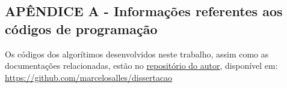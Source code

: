 \documentclass[brazil,hardcopy,openany]{ufscthesis} %
\begin{document}
%




\backmatter

\begin{appendices}
	\chapter{APÊNDICE A - Informações referentes aos códigos de programação} \label{chap:codigos}
	Os códigos dos algorítimos desenvolvidos neste trabalho, assim como as documentações relacionadas, estão no \href{https://github.com/marcelosalles/}{repositório do autor}, disponível em: \url{https://github.com/marcelosalles/dissertacao}
\end{appendices}
	
\end{document}
